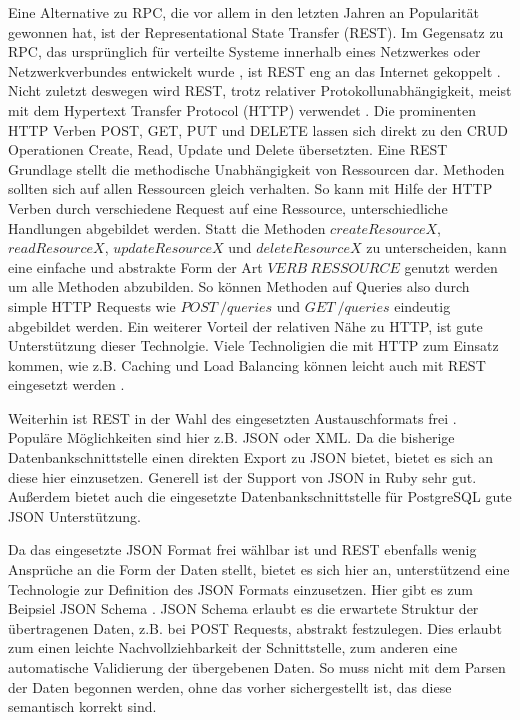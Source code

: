 Eine Alternative zu RPC, die vor allem in den letzten Jahren an Popularität gewonnen hat, ist der Representational State Transfer (REST). Im Gegensatz zu RPC, das ursprünglich für verteilte Systeme innerhalb eines Netzwerkes oder Netzwerkverbundes entwickelt wurde \cite{rpc:history}, ist REST eng an das Internet gekoppelt \cite[vgl.][Seite 49]{newman2015building}. Nicht zuletzt deswegen wird REST, trotz relativer Protokollunabhängigkeit, meist mit dem Hypertext Transfer Protocol (HTTP) verwendet \cite[vgl.][Seite 50]{newman2015building}. Die prominenten HTTP Verben POST, GET, PUT und DELETE lassen sich direkt zu den CRUD Operationen Create, Read, Update und Delete übersetzten. Eine REST Grundlage stellt die methodische Unabhängigkeit von Ressourcen dar. Methoden sollten sich auf allen Ressourcen gleich verhalten. So kann mit Hilfe der HTTP Verben durch verschiedene Request auf eine Ressource, unterschiedliche Handlungen abgebildet werden. Statt die Methoden $createResourceX$, $readResourceX$, $updateResourceX$ und $deleteResourceX$ zu unterscheiden, kann eine einfache und abstrakte Form der Art $VERB\ RESSOURCE$ genutzt werden um alle Methoden abzubilden. So können Methoden auf Queries also durch simple HTTP Requests wie $POST\ /queries$ und $GET\ /queries$ eindeutig abgebildet werden. Ein weiterer Vorteil der relativen Nähe zu HTTP, ist gute Unterstützung dieser Technolgie. Viele Technoligien die mit HTTP zum Einsatz kommen, wie z.B. Caching und Load Balancing können leicht auch mit REST eingesetzt werden \cite{rest:loadbalancing}.

Weiterhin ist REST in der Wahl des eingesetzten Austauschformats frei \cite[][Seite 53]{newman2015building}. Populäre Möglichkeiten sind hier z.B. JSON oder XML. Da die bisherige Datenbankschnittstelle einen direkten Export zu JSON bietet, bietet es sich an diese hier einzusetzen. Generell ist der Support von JSON in Ruby sehr gut. Außerdem bietet auch die eingesetzte Datenbankschnittstelle \cite{sequel} für PostgreSQL gute JSON Unterstützung.

Da das eingesetzte JSON Format frei wählbar ist und REST ebenfalls wenig Ansprüche an die Form der Daten stellt, bietet es sich hier an, unterstützend eine Technologie zur Definition des JSON Formats einzusetzen. Hier gibt es zum Beipsiel JSON Schema \cite{jsonschema}. JSON Schema erlaubt es die erwartete Struktur der übertragenen Daten, z.B. bei POST Requests, abstrakt festzulegen. Dies erlaubt zum einen leichte Nachvollziehbarkeit der Schnittstelle, zum anderen eine automatische Validierung der übergebenen Daten. So muss nicht mit dem Parsen der Daten begonnen werden, ohne das vorher sichergestellt ist, das diese semantisch korrekt sind.

